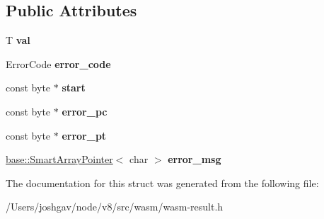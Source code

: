 \subsection*{Public Attributes}
\begin{DoxyCompactItemize}
\item 
T {\bfseries val}\hypertarget{structv8_1_1internal_1_1wasm_1_1_result_a2c9d5feb0c9be8ec4e7a694ebebbc711}{}\label{structv8_1_1internal_1_1wasm_1_1_result_a2c9d5feb0c9be8ec4e7a694ebebbc711}

\item 
Error\+Code {\bfseries error\+\_\+code}\hypertarget{structv8_1_1internal_1_1wasm_1_1_result_a3b5cfe33c3f1ed9cc70b87b14bb80547}{}\label{structv8_1_1internal_1_1wasm_1_1_result_a3b5cfe33c3f1ed9cc70b87b14bb80547}

\item 
const byte $\ast$ {\bfseries start}\hypertarget{structv8_1_1internal_1_1wasm_1_1_result_a59f4213efe61de2fd0ea7e2f7d9698c5}{}\label{structv8_1_1internal_1_1wasm_1_1_result_a59f4213efe61de2fd0ea7e2f7d9698c5}

\item 
const byte $\ast$ {\bfseries error\+\_\+pc}\hypertarget{structv8_1_1internal_1_1wasm_1_1_result_a026d6e22b92054ca1d8f1b74a633dd40}{}\label{structv8_1_1internal_1_1wasm_1_1_result_a026d6e22b92054ca1d8f1b74a633dd40}

\item 
const byte $\ast$ {\bfseries error\+\_\+pt}\hypertarget{structv8_1_1internal_1_1wasm_1_1_result_afadf077c27d601275a65abe2064e9f99}{}\label{structv8_1_1internal_1_1wasm_1_1_result_afadf077c27d601275a65abe2064e9f99}

\item 
\hyperlink{classv8_1_1base_1_1_smart_array_pointer}{base\+::\+Smart\+Array\+Pointer}$<$ char $>$ {\bfseries error\+\_\+msg}\hypertarget{structv8_1_1internal_1_1wasm_1_1_result_ae89f9619a477a3ec9f6c97ff68054ed4}{}\label{structv8_1_1internal_1_1wasm_1_1_result_ae89f9619a477a3ec9f6c97ff68054ed4}

\end{DoxyCompactItemize}


The documentation for this struct was generated from the following file\+:\begin{DoxyCompactItemize}
\item 
/\+Users/joshgav/node/v8/src/wasm/wasm-\/result.\+h\end{DoxyCompactItemize}
